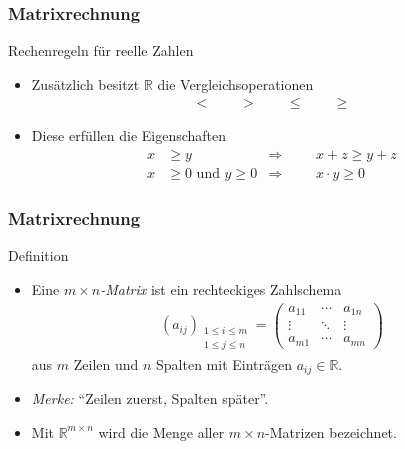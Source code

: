 \documentclass{beamer}
\renewcommand{\emph}[1]{{\textcolor{solarizedRed}{\itshape #1}}}
\newcommand\RR{\mathbb R}
\renewcommand{\ae}{\"a}
\newcommand{\ue}{\"u}
\newcommand{\mytitle}{Matrixrechnung}
\begin{document}
\begin{frame}\frametitle{\mytitle}
	\begin{block}{Rechenregeln f\ue r reelle Zahlen}
	\begin{itemize}
	\item Zus\ae tzlich besitzt $\RR$ die Vergleichsoperationen
		\begin{align*}
		<\qquad >\qquad \leq\qquad \geq
		\end{align*}
	\item Diese erf\ue llen die Eigenschaften
		\begin{align*}
			x&\geq y&\Rightarrow&&&x+z\geq y+z\\
			x&\geq 0\mbox{ und }y\geq 0&\Rightarrow&&&x\cdot y\geq0
		\end{align*}
	\end{itemize}
	\end{block}
\end{frame}

\begin{frame}\frametitle{\mytitle}
	\begin{block}{Definition}
		\begin{itemize}
			\item Eine \emph{$m\times n$-Matrix} ist ein rechteckiges Zahlschema
				\begin{align*}
					(a_{ij})_{\substack{1\leq i\leq m\\1\leq j\leq n}}=\begin{pmatrix}a_{11}&\cdots&a_{1n}\\\vdots&\ddots&\vdots\\a_{m1}&\cdots&a_{mn}\end{pmatrix}
				\end{align*}
				aus $m$ Zeilen und $n$ Spalten mit Eintr\ae gen $a_{ij}\in\RR$.
			\item \emph{Merke:} ``Zeilen zuerst, Spalten sp\ae ter''.
			\item Mit $\RR^{m\times n}$ wird die Menge aller $m\times n$-Matrizen bezeichnet.
		\end{itemize}
	\end{block}
\end{frame}
\end{document}
